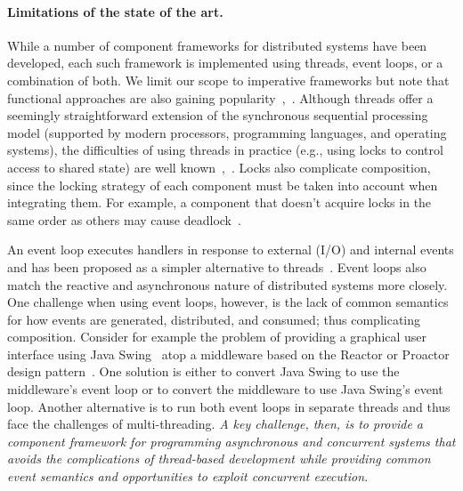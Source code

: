 \paragraph*{Limitations of the state of the art.}
While a number of component frameworks for distributed systems have been developed, each such framework is implemented using threads, event loops, or a combination of both.
We limit our scope to imperative frameworks but note that functional approaches are also gaining popularity~\cite{armstrong1996concurrent},~\cite{halloway2009programming}.
Although threads offer a seemingly straightforward extension of the synchronous sequential processing model (supported by modern processors, programming languages, and operating systems),
the difficulties of using threads in practice (e.g., using locks to control access to shared state) are well known~\cite{lee2006problem},~\cite{sutter2005free}.
Locks also complicate composition, since the locking strategy of each component must be taken into account when integrating them.
For example, a component that doesn't acquire locks in the same order as others may cause deadlock~\cite{havender1968avoiding}.

An event loop executes handlers in response to external (I/O) and internal events and has been proposed as a simpler alternative to threads~\cite{ousterhout1996threads}.
Event loops also match the reactive and asynchronous nature of distributed systems more closely.
One challenge when using event loops, however, is the lack of common semantics for how events are generated, distributed, and consumed; thus complicating composition.
Consider for example the problem of providing a graphical user interface using Java Swing~\cite{eckstein1998java} atop a middleware based on the Reactor or Proactor design pattern~\cite{schmidt2000pattern}.
One solution is either to convert Java Swing to use the middleware's event loop or to convert the middleware to use Java Swing's event loop.
Another alternative is to run both event loops in separate threads and thus face the challenges of multi-threading.
\emph{A key challenge, then, is to provide a component framework for programming asynchronous and concurrent systems that avoids the complications of thread-based development while providing common event semantics and opportunities to exploit concurrent execution.}

